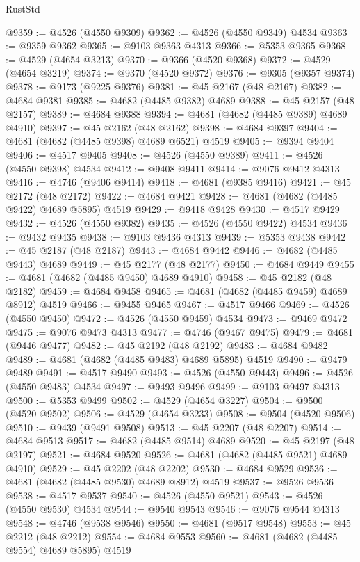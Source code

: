 \begin{lexlean}{RustStd}
\begin{coremodule}
@9359 := @4526 (@4550 @9309)
@9362 := @4526 (@4550 @9349) @4534
@9363 := @9359 @9362
@9365 := @9103 @9363 @4313
@9366 := @5353 @9365
@9368 := @4529 (@4654 @3213)
@9370 := @9366 (@4520 @9368)
@9372 := @4529 (@4654 @3219)
@9374 := @9370 (@4520 @9372)
@9376 := @9305 (@9357 @9374)
@9378 := @9173 (@9225 @9376)
@9381 := @45 @2167 (@48 @2167)
@9382 := @4684 @9381
@9385 := @4682 (@4485 @9382) @4689
@9388 := @45 @2157 (@48 @2157)
@9389 := @4684 @9388
@9394 := @4681 (@4682 (@4485 @9389) @4689 @4910)
@9397 := @45 @2162 (@48 @2162)
@9398 := @4684 @9397
@9404 := @4681 (@4682 (@4485 @9398) @4689 @6521) @4519
@9405 := @9394 @9404
@9406 := @4517 @9405
@9408 := @4526 (@4550 @9389)
@9411 := @4526 (@4550 @9398) @4534
@9412 := @9408 @9411
@9414 := @9076 @9412 @4313
@9416 := @4746 (@9406 @9414)
@9418 := @4681 (@9385 @9416)
@9421 := @45 @2172 (@48 @2172)
@9422 := @4684 @9421
@9428 := @4681 (@4682 (@4485 @9422) @4689 @5895) @4519
@9429 := @9418 @9428
@9430 := @4517 @9429
@9432 := @4526 (@4550 @9382)
@9435 := @4526 (@4550 @9422) @4534
@9436 := @9432 @9435
@9438 := @9103 @9436 @4313
@9439 := @5353 @9438
@9442 := @45 @2187 (@48 @2187)
@9443 := @4684 @9442
@9446 := @4682 (@4485 @9443) @4689
@9449 := @45 @2177 (@48 @2177)
@9450 := @4684 @9449
@9455 := @4681 (@4682 (@4485 @9450) @4689 @4910)
@9458 := @45 @2182 (@48 @2182)
@9459 := @4684 @9458
@9465 := @4681 (@4682 (@4485 @9459) @4689 @8912) @4519
@9466 := @9455 @9465
@9467 := @4517 @9466
@9469 := @4526 (@4550 @9450)
@9472 := @4526 (@4550 @9459) @4534
@9473 := @9469 @9472
@9475 := @9076 @9473 @4313
@9477 := @4746 (@9467 @9475)
@9479 := @4681 (@9446 @9477)
@9482 := @45 @2192 (@48 @2192)
@9483 := @4684 @9482
@9489 := @4681 (@4682 (@4485 @9483) @4689 @5895) @4519
@9490 := @9479 @9489
@9491 := @4517 @9490
@9493 := @4526 (@4550 @9443)
@9496 := @4526 (@4550 @9483) @4534
@9497 := @9493 @9496
@9499 := @9103 @9497 @4313
@9500 := @5353 @9499
@9502 := @4529 (@4654 @3227)
@9504 := @9500 (@4520 @9502)
@9506 := @4529 (@4654 @3233)
@9508 := @9504 (@4520 @9506)
@9510 := @9439 (@9491 @9508)
@9513 := @45 @2207 (@48 @2207)
@9514 := @4684 @9513
@9517 := @4682 (@4485 @9514) @4689
@9520 := @45 @2197 (@48 @2197)
@9521 := @4684 @9520
@9526 := @4681 (@4682 (@4485 @9521) @4689 @4910)
@9529 := @45 @2202 (@48 @2202)
@9530 := @4684 @9529
@9536 := @4681 (@4682 (@4485 @9530) @4689 @8912) @4519
@9537 := @9526 @9536
@9538 := @4517 @9537
@9540 := @4526 (@4550 @9521)
@9543 := @4526 (@4550 @9530) @4534
@9544 := @9540 @9543
@9546 := @9076 @9544 @4313
@9548 := @4746 (@9538 @9546)
@9550 := @4681 (@9517 @9548)
@9553 := @45 @2212 (@48 @2212)
@9554 := @4684 @9553
@9560 := @4681 (@4682 (@4485 @9554) @4689 @5895) @4519

\end{coremodule}
\end{lexlean}
